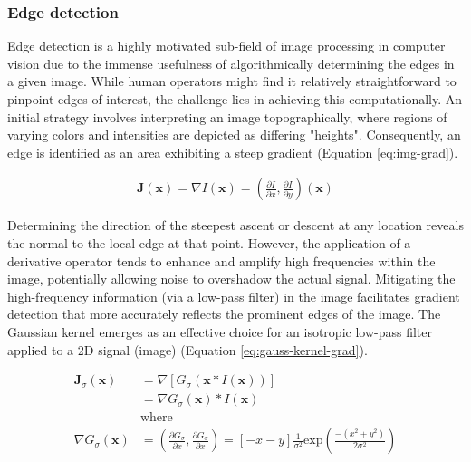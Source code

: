 \subsubsection{Edge detection}
Edge detection is a highly motivated sub-field of image processing in computer vision due to the immense usefulness of algorithmically determining the edges in a given image.
While human operators might find it relatively straightforward to pinpoint edges of interest, the challenge lies in achieving this computationally.
An initial strategy involves interpreting an image topographically, where regions of varying colors and intensities are depicted as differing "heights".
Consequently, an edge is identified as an area exhibiting a steep gradient (Equation \ref{eq:img-grad}).

\begin{equation}
    \begin{aligned}
        \mathbf{J}(\mathbf{x}) = \nabla I(\mathbf{x}) = (\frac{\partial I}{\partial x}, \frac{\partial I}{\partial y})(\mathbf{x})
    \end{aligned}
    \label{eq:img-grad}
\end{equation}

Determining the direction of the steepest ascent or descent at any location reveals the normal to the local edge at that point.
However, the application of a derivative operator tends to enhance and amplify high frequencies within the image, potentially allowing noise to overshadow the actual signal.
Mitigating the high-frequency information (via a low-pass filter) in the image facilitates gradient detection that more accurately reflects the prominent edges of the image.
The Gaussian kernel emerges as an effective choice for an isotropic low-pass filter applied to a 2D signal (image) (Equation \ref{eq:gauss-kernel-grad}).

\begin{equation}
    \begin{aligned}
        \mathbf{J}_{\sigma}(\mathbf{x}) &= \nabla [G_\sigma (\mathbf{x} * I(\mathbf{x}))] \\
        &= \nabla G_\sigma (\mathbf{x}) * I(\mathbf{x}) \\
        &\text{where} \\
        \nabla G_\sigma (\mathbf{x}) &= (\frac{\partial G_{\sigma}}{\partial x}, \frac{\partial G_{\sigma}}{\partial x}) = [-x - y]\frac{1}{\sigma^{2}}\text{exp}(\frac{-(x^2 + y^2)}{2 \sigma^2})
    \end{aligned}
    \label{eq:gauss-kernel-grad}
\end{equation}


